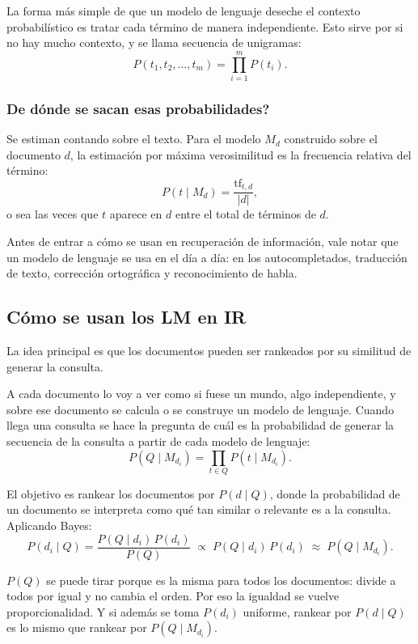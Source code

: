 \documentclass[11pt,letterpaper]{article}
\begin{document}
La forma más simple de que un modelo de lenguaje deseche el contexto
probabilístico es tratar cada término de manera independiente. Esto
sirve por si no hay mucho contexto, y se llama secuencia de unigramas:
\[
    P(t_1, t_2, \ldots, t_m) = \prod_{i=1}^{m} P(t_i) .
\]

\subsubsection*{De dónde se sacan esas probabilidades?}

Se estiman contando sobre el texto. Para el modelo $M_d$ construido
sobre el documento $d$, la estimación por máxima verosimilitud es la
frecuencia relativa del término:
\[
    P(t \mid M_d) = \frac{\mathrm{tf}_{t,d}}{|d|} ,
\]
o sea las veces que $t$ aparece en $d$ entre el total de términos de
$d$.

Antes de entrar a cómo se usan en recuperación de información, vale
notar que un modelo de lenguaje se usa en el día a día: en los
autocompletados, traducción de texto, corrección ortográfica y
reconocimiento de habla.


\subsection*{Cómo se usan los LM en IR}

La idea principal es que los documentos pueden ser rankeados por su
similitud de generar la consulta.

A cada documento lo voy a ver como si fuese un mundo, algo
independiente, y sobre ese documento se calcula o se construye un
modelo de lenguaje. Cuando llega una consulta se hace la pregunta de
cuál es la probabilidad de generar la secuencia de la consulta a
partir de cada modelo de lenguaje:
\[
    P(Q \mid M_{d_i}) = \prod_{t \in Q} P(t \mid M_{d_i}) .
\]

El objetivo es rankear los documentos por $P(d \mid Q)$, donde la
probabilidad de un documento se interpreta como qué tan similar o
relevante es a la consulta. Aplicando Bayes:
\[
    P(d_i \mid Q) = \frac{P(Q \mid d_i)\, P(d_i)}{P(Q)}
    \;\propto\; P(Q \mid d_i)\, P(d_i)
    \;\approx\; P(Q \mid M_{d_i}) .
\]

\begin{ojo}
    $P(Q)$ se puede tirar porque es la misma para todos los
    documentos: divide a todos por igual y no cambia el orden. Por eso
    la igualdad se vuelve proporcionalidad. Y si además se toma
    $P(d_i)$ uniforme, rankear por $P(d \mid Q)$ es lo mismo que
    rankear por $P(Q \mid M_{d_i})$.
\end{ojo}
\end{document}
